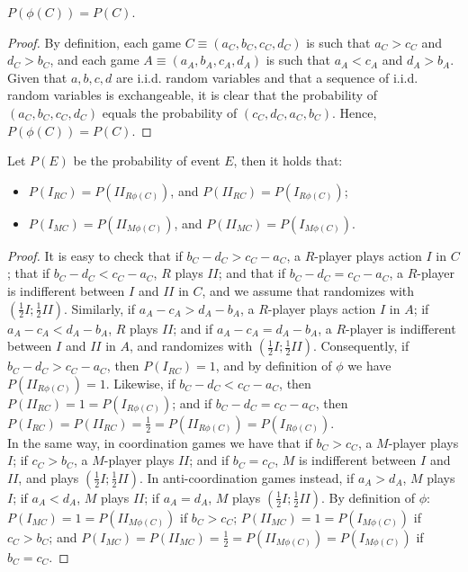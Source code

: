 \documentclass[fleqn,reqno,11pt]{article}
\begin{document}
\medskip{}

\begin{lemma} \label{lemma:probabilities coord-ant}
$P(\phi(C))=P(C)$.
\end{lemma}

\begin{proof}
By definition, each game $C\equiv(a_{C},b_{C},c_{C},d_{C})$
is such that $a_{C}>c_{C}$ and $d_{C}>b_{C}$, and
each game $A\equiv(a_{A},b_{A},c_{A},d_{A})$
is such that $a_{A}<c_{A}$ and $d_{A}>b_{A}$. Given that
$a,b,c,d$ are i.i.d. random variables and that a sequence of i.i.d. random variables is exchangeable,
it is clear that the probability of $(a_{C},b_{C},c_{C},d_{C})$ equals the probability of $(c_{C},d_{C},a_{C},b_{C})$.
Hence, $P(\phi(C))=P(C)$.
\end{proof}

\medskip{}

\begin{lemma} \label{lemma:probabilities actions coord-ant}
Let $P(E)$ be the probability of event $E$, then
it holds that:
\begin{itemize}
\item $P(I_{RC})=P(II_{R\phi(C)})$, and $P(II_{RC})=P(I_{R\phi(C)})$;
\item $P(I_{MC})=P(II_{M\phi(C)})$, and $P(II_{MC})=P(I_{M\phi(C)})$.
\end{itemize}
\end{lemma}

\begin{proof}
It is easy to check that if $b_{C}-d_{C}>c_{C}-a_{C}$,
a $R$-player plays action $I$ in $C$; that if $b_{C}-d_{C}<c_{C}-a_{C}$,
$R$ plays $II$; and that if $b_{C}-d_{C}=c_{C}-a_{C}$,
a $R$-player is indifferent between $I$ and $II$ in $C$, and
we assume that randomizes with $(\frac{1}{2}I;\frac{1}{2}II)$. Similarly,
if $a_{A}-c_{A}>d_{A}-b_{A}$, a $R$-player plays action
$I$ in $A$; if $a_{A}-c_{A}<d_{A}-b_{A}$, $R$
plays $II$; and if $a_{A}-c_{A}=d_{A}-b_{A}$, a
$R$-player is indifferent between $I$ and $II$ in $A$, and randomizes
with $(\frac{1}{2}I;\frac{1}{2}II)$. Consequently, if $b_{C}-d_{C}>c_{C}-a_{C}$,
then $P(I_{RC})=1$, and by definition of $\phi$ we have
$P(II_{R\phi(C)})=1$. Likewise, if $b_{C}-d_{C}<c_{C}-a_{C}$,
then $P(II_{RC})=1=P(I_{R\phi(C)})$; and if $b_{C}-d_{C}=c_{C}-a_{C}$,
then $P(I_{RC})=P(II_{RC})=\frac{1}{2}=P(II_{R\phi(C)})=P(I_{R\phi(C)})$. \\
In the same way, in coordination games we have that if $b_{C}>c_{C}$,
a $M$-player plays $I$; if $c_{C}>b_{C}$, a $M$-player plays
$II$; and if $b_{C}=c_{C}$, $M$ is indifferent between $I$
and $II$, and plays $(\frac{1}{2}I;\frac{1}{2}II)$. In anti-coordination
games instead, if $a_{A}>d_{A}$, $M$ plays $I$; if $a_{A}<d_{A}$,
$M$ plays $II$; if $a_{A}=d_{A}$, $M$ plays $(\frac{1}{2}I;\frac{1}{2}II)$.
By definition of $\phi$: $P(I_{MC})=1=P(II_{M\phi(C)})$
if $b_{C}>c_{C}$; $P(II_{MC})=1=P(I_{M\phi(C)})$
if $c_{C}>b_{C}$; and $P(I_{MC})=P(II_{MC})=\frac{1}{2}=P(II_{M\phi(C)})=P(I_{M\phi(C)})$
if $b_{C}=c_{C}$.
\end{proof}
\end{document}
